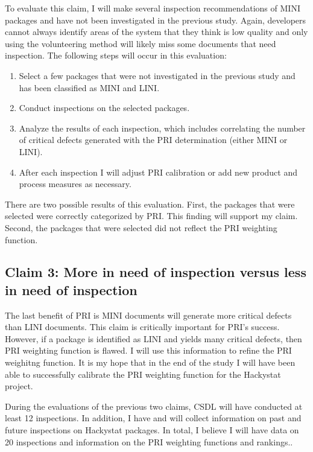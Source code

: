 \hspace*{1pt}

To evaluate this claim, I will make several inspection recommendations of
MINI packages and have not been investigated in the previous study. Again,
developers cannot always identify areas of the system that they think is
low quality and only using the volunteering method will likely miss some
documents that need inspection. The following steps will occur in this
evaluation:

\begin{enumerate}
\item Select a few packages that were not investigated in the previous
  study and has been classified as MINI and LINI. 
\item Conduct inspections on the selected packages. 
\item Analyze the results of each inspection, which includes correlating
  the number of critical defects generated with the PRI determination
  (either MINI or LINI). 
\item After each inspection I will adjust PRI calibration or add new
  product and process measures as necessary.
\end{enumerate}

There are two possible results of this evaluation. First, the packages that
were selected were correctly categorized by PRI. This finding will support
my claim. Second, the packages that were selected did not reflect the PRI
weighting function.




\subsection{Claim 3: More in need of inspection versus less in need of inspection}
\label{sec:claim3}
The last benefit of PRI is MINI documents will generate more critical
defects than LINI documents. This claim is critically important for PRI's
success. However, if a package is identified as LINI and yields many
critical defects, then PRI weighting function is flawed. I will use this
information to refine the PRI weighitng function. It is my hope that in the
end of the study I will have been able to successfully calibrate the PRI
weighting function for the Hackystat project.

During the evaluations of the previous two claims, CSDL will have conducted
at least 12 inspections.  In addition, I have and will collect information
on past and future inspections on Hackystat packages. In total, I believe I
will have data on 20 inspections and information on the PRI weighting
functions and rankings..

